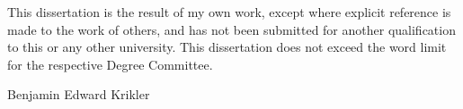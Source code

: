 %

\begin{abstract}%
\end{abstract}

\begin{declaration}
  This dissertation is the result of my own work, except where explicit
  reference is made to the work of others, and has not been submitted
  for another qualification to this or any other university. This
  dissertation does not exceed the word limit for the respective Degree
  Committee.
  \vspace*{1cm}
  \begin{flushright}
	Benjamin Edward Krikler
  \end{flushright}
\end{declaration}


